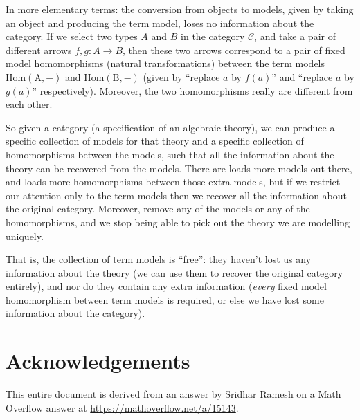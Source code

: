 \documentclass[11pt]{amsart}
\newcommand{\homfrom}[1]{\mathrm{Hom\left(#1, -\right)}}
\begin{document}
    In more elementary terms: the conversion from objects to models, given by taking an object and producing the term model, loses no information about the category.
    If we select two types $A$ and $B$ in the category $\mathcal{C}$, and take a pair of different arrows $f, g : A \to B$, then these two arrows correspond to a pair of fixed model homomorphisms (natural transformations) between the term models $\homfrom{A}$ and $\homfrom{B}$ (given by ``replace $a$ by $f(a)$'' and ``replace $a$ by $g(a)$'' respectively).
    Moreover, the two homomorphisms really are different from each other.

    So given a category (a specification of an algebraic theory), we can produce a specific collection of models for that theory and a specific collection of homomorphisms between the models, such that all the information about the theory can be recovered from the models.
    There are loads more models out there, and loads more homomorphisms between those extra models, but if we restrict our attention only to the term models then we recover all the information about the original category.
    Moreover, remove any of the models or any of the homomorphisms, and we stop being able to pick out the theory we are modelling uniquely.

    That is, the collection of term models is ``free'': they haven't lost us any information about the theory (we can use them to recover the original category entirely), and nor do they contain any extra information (\emph{every} fixed model homomorphism between term models is required, or else we have lost some information about the category).

    \section{Acknowledgements}

    This entire document is derived from an answer by Sridhar Ramesh on a Math Overflow answer at \url{https://mathoverflow.net/a/15143}.
\end{document}
